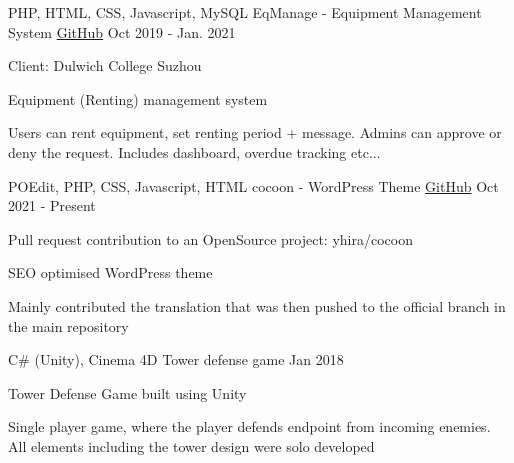 \begin{cventries}
  \cventry
    {PHP, HTML, CSS, Javascript, MySQL} 
    {EqManage - Equipment Management System}
    {\href{https://github.com/YukiKume/EqManage}{GitHub}} %
    {Oct 2019 - Jan. 2021}
    {
      \begin{cvitems}
        \item {Client: Dulwich College Suzhou}
        \item {Equipment (Renting) management system}
        \item {Users can rent equipment, set renting period + message. Admins can approve or deny the request. Includes dashboard, overdue tracking etc...}
      \end{cvitems}
    }

  \cventry
  {POEdit, PHP, CSS, Javascript, HTML}
  {cocoon - WordPress Theme}
  {\href{https://github.com/WrenHainsworth/cocoon}{GitHub}} %
  {Oct 2021 - Present}
  {
    \begin{cvitems}
      \item {Pull request contribution to an OpenSource project: yhira/cocoon}
      \item {SEO optimised WordPress theme}
      \item {Mainly contributed the translation that was then pushed to the official branch in the main repository}
    \end{cvitems}
  }

  \cventry
  {C\# (Unity), Cinema 4D}
  {Tower defense game}
  {} %
  {Jan 2018}
  {
    \begin{cvitems}
      \item {Tower Defense Game built using Unity}
      \item {Single player game, where the player defends endpoint from incoming enemies. All elements including the tower design were solo developed}
    \end{cvitems}
  }


\end{cventries}
